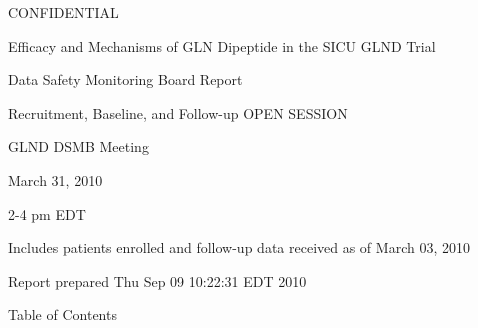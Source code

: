 \documentclass[dvips,10pt]{article}
\begin{document}
\vspace*{1in}
\begin{center}
{\Huge{CONFIDENTIAL}}
\end{center}
\vspace*{0.5in}
\begin{center}
{\Huge{Efficacy and Mechanisms of GLN Dipeptide in the SICU GLND Trial}}
\end{center}
\vspace*{0.5in}
\begin{center}
{\Huge{Data Safety Monitoring Board Report}}
\end{center}
\vspace*{0.25in}
\begin{center}
{\Huge{
Recruitment, Baseline, and Follow-up  OPEN SESSION
}}
\end{center}
\vspace*{1in}
\begin{center}
{\Huge{GLND DSMB Meeting}}
\end{center}
\begin{center}
{\Huge{
 March 31, 2010
}}
\end{center}
\begin{center}
{\Huge{2-4 pm EDT}}
\end{center}
\vspace*{1in}
\begin{center}
\noindent
{\Large{Includes patients enrolled and follow-up data received as of March 03, 2010}}
\end{center}
\vspace*{0.5in}
\begin{center}
{\Large{Report prepared  Thu Sep 09 10:22:31 EDT 2010 }}
\end{center}
\clearpage
\vspace*{1in}
\begin{center}
{\Huge{Table of Contents}}
\end{center}
\listoftables
\listoffigures
\clearpage
\end{document}
